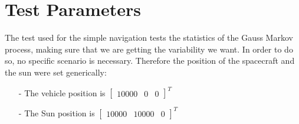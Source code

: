 \section{Test Parameters}

The test used for the simple navigation tests the statistics of the Gauss Markov process, making sure that we are getting the variability we want. In order to do so, no specific scenario is necessary. Therefore the position of the spacecraft and the sun were set generically:

\begin{itemize}
    \item[-] The vehicle position is $\begin{bmatrix}10000 & 0 & 0 \end{bmatrix}^T$
   \item[-] The Sun position is  $\begin{bmatrix}10000 & 10000 & 0 \end{bmatrix}^T$
    \end{itemize}
